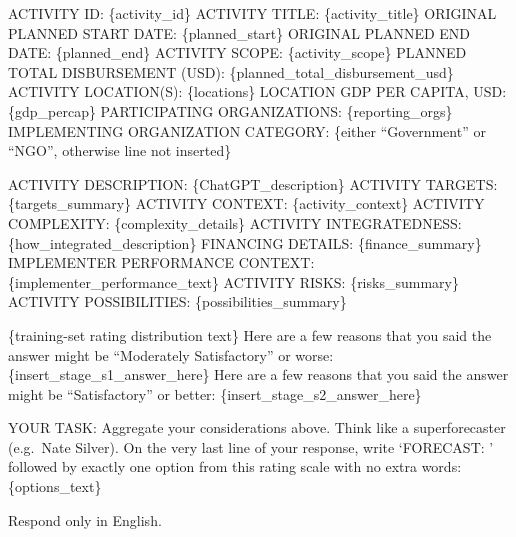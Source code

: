 \documentclass[12pt,a4paper]{article}
\begin{document}
\begin{boxedprompt}
ACTIVITY ID: \{activity\_id\}\newline
ACTIVITY TITLE: \{activity\_title\}\newline
ORIGINAL PLANNED START DATE: \{planned\_start\}\newline
ORIGINAL PLANNED END DATE: \{planned\_end\}\newline
ACTIVITY SCOPE: \{activity\_scope\}\newline
PLANNED TOTAL DISBURSEMENT (USD): \{planned\_total\_disbursement\_usd\}\newline
ACTIVITY LOCATION(S): \{locations\}\newline
LOCATION GDP PER CAPITA, USD: \{gdp\_percap\}\newline
PARTICIPATING ORGANIZATIONS: \{reporting\_orgs\}\newline
IMPLEMENTING ORGANIZATION CATEGORY: \{either ``Government'' or ``NGO'', otherwise line not inserted\}\newline

ACTIVITY DESCRIPTION: \{ChatGPT\_description\}\newline
ACTIVITY TARGETS: \{targets\_summary\}\newline
ACTIVITY CONTEXT: \{activity\_context\}\newline
ACTIVITY COMPLEXITY: \{complexity\_details\}\newline
ACTIVITY INTEGRATEDNESS: \{how\_integrated\_description\}\newline
FINANCING DETAILS: \{finance\_summary\}\newline
IMPLEMENTER PERFORMANCE CONTEXT: \{implementer\_performance\_text\}\newline
ACTIVITY RISKS:\newline
\{risks\_summary\}\newline
ACTIVITY POSSIBILITIES: \{possibilities\_summary\}\newline


\{training-set rating distribution text\}\newline
Here are a few reasons that you said the answer might be ``Moderately Satisfactory'' or worse:\newline
\{insert\_stage\_s1\_answer\_here\}\newline
Here are a few reasons that you said the answer might be ``Satisfactory'' or better:\newline
\{insert\_stage\_s2\_answer\_here\}\newline

YOUR TASK:\newline
Aggregate your considerations above. Think like a superforecaster (e.g.\ Nate Silver).
On the very last line of your response, write `FORECAST: ' followed by exactly one option from this rating scale with no extra words:\newline
\{options\_text\}\newline

Respond only in English.
  
\end{boxedprompt}
\label{fig:forecast-prompt-multistage}
\vspace{1em}
\end{document}
